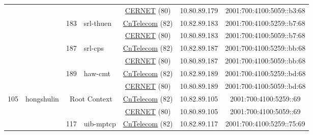 \begin{small}
\begin{center}
\begin{longtable}{|c|c|c|c|c|c|c|c|}
  &  &  &  & \multicolumn{2}{|c|}{\tiny{\href{http://www.cernet.edu.cn}{CERNET} (80)}} & \tiny{10.80.89.179} & \tiny{2001:700:4100:5059::b3:68} \\* \cline{3-3}\cline{4-4}\cline{5-5}\cline{6-6}\cline{7-7}\cline{8-8}
  &  & \multirow{2}{*}{\tiny{183}} & \multicolumn{1}{|l|}{\multirow{2}{*}{\tiny{srl-thuen}}} & \multicolumn{2}{|c|}{\tiny{\href{http://www.chinatelecom.com.cn}{CnTelecom} (82)}} & \tiny{10.82.89.183} & \tiny{2001:700:4100:5259::b7:68} \\* \cline{5-5}\cline{6-6}\cline{7-7}\cline{8-8}
  &  &  &  & \multicolumn{2}{|c|}{\tiny{\href{http://www.cernet.edu.cn}{CERNET} (80)}} & \tiny{10.80.89.183} & \tiny{2001:700:4100:5059::b7:68} \\* \cline{3-3}\cline{4-4}\cline{5-5}\cline{6-6}\cline{7-7}\cline{8-8}
  &  & \multirow{2}{*}{\tiny{187}} & \multicolumn{1}{|l|}{\multirow{2}{*}{\tiny{srl-cps}}} & \multicolumn{2}{|c|}{\tiny{\href{http://www.chinatelecom.com.cn}{CnTelecom} (82)}} & \tiny{10.82.89.187} & \tiny{2001:700:4100:5259::bb:68} \\* \cline{5-5}\cline{6-6}\cline{7-7}\cline{8-8}
  &  &  &  & \multicolumn{2}{|c|}{\tiny{\href{http://www.cernet.edu.cn}{CERNET} (80)}} & \tiny{10.80.89.187} & \tiny{2001:700:4100:5059::bb:68} \\* \cline{3-3}\cline{4-4}\cline{5-5}\cline{6-6}\cline{7-7}\cline{8-8}
  &  & \multirow{2}{*}{\tiny{189}} & \multicolumn{1}{|l|}{\multirow{2}{*}{\tiny{haw-cmt}}} & \multicolumn{2}{|c|}{\tiny{\href{http://www.chinatelecom.com.cn}{CnTelecom} (82)}} & \tiny{10.82.89.189} & \tiny{2001:700:4100:5259::bd:68} \\* \cline{5-5}\cline{6-6}\cline{7-7}\cline{8-8}
  &  &  &  & \multicolumn{2}{|c|}{\tiny{\href{http://www.cernet.edu.cn}{CERNET} (80)}} & \tiny{10.80.89.189} & \tiny{2001:700:4100:5059::bd:68} \\ \hline
 \multirow{36}{*}{\tiny{105}} & \multicolumn{1}{|l|}{\multirow{36}{*}{\tiny{hongshulin}}} & \multicolumn{2}{|c|}{\multirow{2}{*}{\tiny{Root Context}}} & \multicolumn{2}{|c|}{\tiny{\href{http://www.chinatelecom.com.cn}{CnTelecom} (82)}} & \tiny{10.82.89.105} & \tiny{2001:700:4100:5259::69} \\* \cline{5-5}\cline{6-6}\cline{7-7}\cline{8-8}
  &  & \multicolumn{2}{|c|}{} & \multicolumn{2}{|c|}{\tiny{\href{http://www.cernet.edu.cn}{CERNET} (80)}} & \tiny{10.80.89.105} & \tiny{2001:700:4100:5059::69} \\* \cline{3-3}\cline{4-4}\cline{5-5}\cline{6-6}\cline{7-7}\cline{8-8}
  &  & \multirow{2}{*}{\tiny{117}} & \multicolumn{1}{|l|}{\multirow{2}{*}{\tiny{uib-mptcp}}} & \multicolumn{2}{|c|}{\tiny{\href{http://www.chinatelecom.com.cn}{CnTelecom} (82)}} & \tiny{10.82.89.117} & \tiny{2001:700:4100:5259::75:69} \\* \cline{5-5}\cline{6-6}\cline{7-7}\cline{8-8}

\end{longtable}
\end{center}
\end{small}
